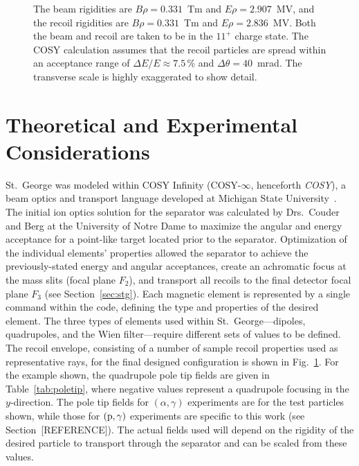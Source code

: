 \begin{figure}
\begin{center}
{            %
            The beam rigidities are $B\rho = 0.331$~Tm and $E\rho = 2.907$~MV,
            and the recoil rigidities are $B\rho = 0.331$~Tm and
            $E\rho = 2.836$~MV. Both the beam and recoil
            are taken to be in the $11^+$ charge state.
            The COSY calculation assumes that the recoil particles are spread
            within an acceptance range of $\Delta E/E \approx7.5$\,\% and
            $\Delta\theta = 40$~mrad. The transverse scale is highly
            exaggerated to show detail.}
        \label{fig:raytrace}
    \end{center}
\end{figure}


\section{Theoretical and Experimental Considerations}
\label{sec:cosy}


St.\ George was modeled within COSY Infinity (COSY-$\infty$, henceforth
\emph{COSY}), a beam optics and transport language developed at Michigan State
University~\cite{COSY}. The initial ion optics solution for the separator was
calculated by
Drs.\ Couder and Berg at the University of Notre Dame to maximize the angular
and energy acceptance for a point-like target located prior to the separator.
Optimization of the individual elements' properties allowed the separator
to achieve the previously-stated energy and angular acceptances, create an
achromatic focus at the mass slits (focal plane $F_2$), and transport all
recoils to the final detector focal plane $F_3$ (see Section~\ref{sec:stg}).
Each magnetic element is represented by a single command within the code,
defining the type and properties of the desired element. The three types of
elements used within St.\ George\----{}dipoles, quadrupoles, and the Wien
filter\----{}require different sets of values to be defined. The recoil
envelope, consisting of a number of sample recoil properties used as
representative rays, for the final designed configuration is shown in
Fig.~\ref{fig:raytrace}. For the example shown, the quadrupole pole tip fields
are given in
Table~\ref{tab:poletip}, where negative values represent a quadrupole focusing
in the $y$-direction. The pole tip fields for $(\alpha,\gamma)$ experiments are
for the test particles shown, while those for $(\rm{p},\gamma)$ experiments are
specific to this work (see Section~[REFERENCE]). The actual fields used will
depend on the rigidity of the desired particle to transport through the
separator and can be scaled from these values.

